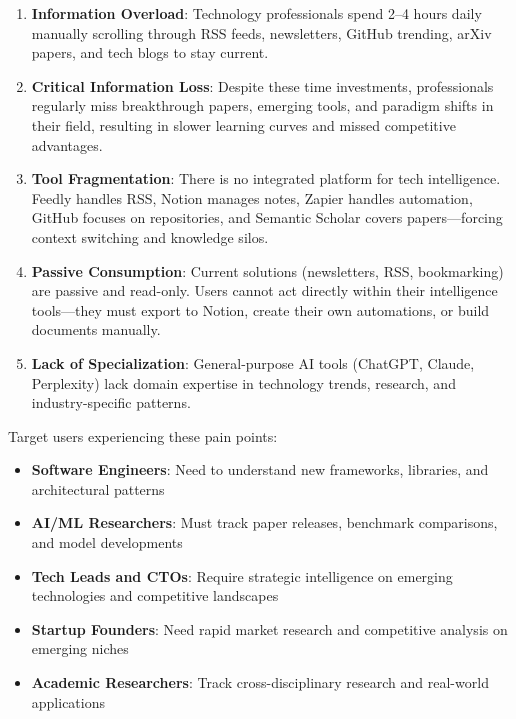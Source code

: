 \documentclass{report}
\begin{document}
\begin{enumerate}
    \item \textbf{Information Overload}: Technology professionals spend 2--4 hours daily manually scrolling through RSS feeds, newsletters, GitHub trending, arXiv papers, and tech blogs to stay current.
    
    \item \textbf{Critical Information Loss}: Despite these time investments, professionals regularly miss breakthrough papers, emerging tools, and paradigm shifts in their field, resulting in slower learning curves and missed competitive advantages.
    
    \item \textbf{Tool Fragmentation}: There is no integrated platform for tech intelligence. Feedly handles RSS, Notion manages notes, Zapier handles automation, GitHub focuses on repositories, and Semantic Scholar covers papers---forcing context switching and knowledge silos.
    
    \item \textbf{Passive Consumption}: Current solutions (newsletters, RSS, bookmarking) are passive and read-only. Users cannot act directly within their intelligence tools---they must export to Notion, create their own automations, or build documents manually.
    
    \item \textbf{Lack of Specialization}: General-purpose AI tools (ChatGPT, Claude, Perplexity) lack domain expertise in technology trends, research, and industry-specific patterns.
\end{enumerate}

Target users experiencing these pain points:
\begin{itemize}
    \item \textbf{Software Engineers}: Need to understand new frameworks, libraries, and architectural patterns
    \item \textbf{AI/ML Researchers}: Must track paper releases, benchmark comparisons, and model developments
    \item \textbf{Tech Leads and CTOs}: Require strategic intelligence on emerging technologies and competitive landscapes
    \item \textbf{Startup Founders}: Need rapid market research and competitive analysis on emerging niches
    \item \textbf{Academic Researchers}: Track cross-disciplinary research and real-world applications
\end{itemize}
\end{document}
